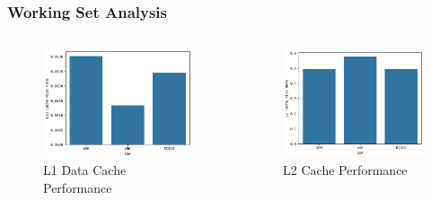 \begin{frame}
	\frametitle{Working Set Analysis}
	\begin{columns}
		\begin{column}{0.4\textwidth}
			\begin{figure}[h]
				\includegraphics[width=\linewidth]{images/l1d.png}
				\caption{L1 Data Cache Performance}
			\end{figure}
		\end{column}

		\begin{column}{0.4\textwidth}
			\begin{figure}[h]
				\includegraphics[width=\linewidth]{images/l2.png}
				\caption{L2 Cache Performance}
			\end{figure}
		\end{column}
	\end{columns}
\end{frame}

